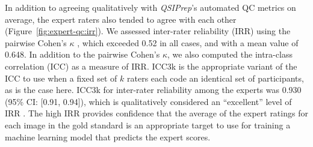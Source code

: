 \documentclass[fleqn,10pt,inline]{wlscirep}
\begin{document}
In addition to agreeing qualitatively with \emph{QSIPrep}'s automated QC metrics
on average, the expert raters also tended to agree with each other (Figure~\ref{fig:expert-qc:irr}). We assessed
inter-rater reliability (IRR) using the pairwise Cohen's $\kappa$
\cite{di-eugenio2004-bb}, which exceeded 0.52 in all cases, and with a mean value of
0.648. In addition to the pairwise Cohen's $\kappa$, we also computed the
intra-class correlation (ICC) \cite{hallgren2012-ze} as a measure of IRR. ICC3k
is the appropriate variant of the ICC to use when a fixed set of $k$ raters each
code an identical set of participants, as is the case here. ICC3k for inter-rater
reliability among the experts was 0.930 (95\% CI: [0.91, 0.94]), which is
qualitatively considered an ``excellent'' level of IRR \cite{Cicchetti1994-fz}.
The high IRR provides confidence that the average of the expert ratings for each
image in the gold standard is an appropriate target to use for training a
machine learning model that predicts the expert scores.
\end{document}
